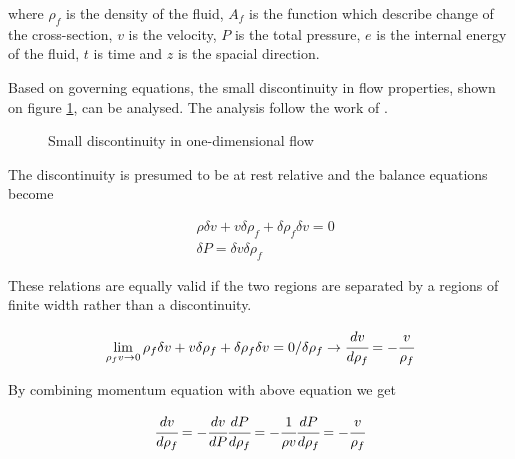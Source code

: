 \documentclass[a4paper,fleqn]{cas-dc}
\begin{document}
where $\rho_f$ is the density of the fluid, $A_f$ is the function which describe change of the cross-section, $v$ is the velocity, $P$ is the total pressure, $e$ is the internal energy of the fluid, $t$ is time and $z$ is the spacial direction.

Based on governing equations, the small discontinuity in flow properties, shown on figure \ref{fig: Discontinuity_slow_flow}, can be analysed. The analysis follow the work of \citet{Schreier1982}.

\begin{figure}[h!]
	\centering
	\caption{Small discontinuity in one-dimensional flow}
	\label{fig: Discontinuity_slow_flow}
\end{figure} 

The discontinuity is presumed to be at rest relative and   the balance equations become		

{\footnotesize
	\begin{align*}
		&\rho \delta v + v \delta \rho_f + \delta \rho_f \delta v = 0 \\
		&\delta P = \delta v \delta \rho_f
	\end{align*}
}

These relations are equally valid if the two regions are separated by a regions of finite width rather than a discontinuity. 

{\footnotesize
	\begin{equation*}
		\lim_{\rho_f v \rightarrow 0} \rho_f \delta v + v \delta \rho_f + \delta \rho_f \delta v = 0 / \delta \rho_f \rightarrow \cfrac{d v}{d \rho_f} = - \cfrac{v}{\rho_f}
	\end{equation*}
}

By combining momentum equation with above equation we get

{\footnotesize
	\begin{equation*}
		\cfrac{d v}{d \rho_f} = - \cfrac{d v}{dP} \cfrac{d P}{d \rho_f} = -\cfrac{1}{\rho v} \cfrac{dP}{d\rho_f} = -\cfrac{v}{\rho_f}
	\end{equation*}
}
\end{document}
